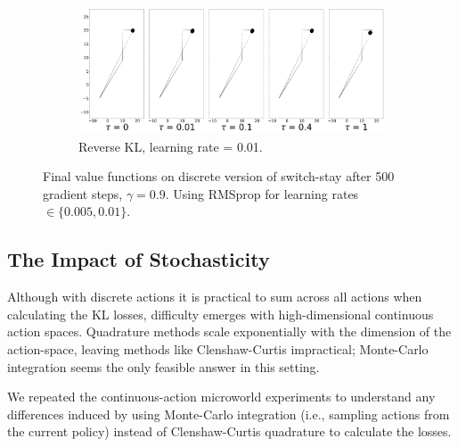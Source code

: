 \documentclass[twoside,11pt]{article}
\begin{document}
\begin{figure}[!htb]
  \begin{subfigure}[b]{0.85\linewidth}
        \centering
        \includegraphics[width=0.8\columnwidth]{figs/switch-stay/notlearnQ/polytope_reverse_optim=rmsprop_lr=[0.01].png}
        \caption{Reverse KL, learning rate = 0.01.}
        \label{fig:discrete-switch-stay-reverse-adam0.01}
  \end{subfigure}
  \caption{Final value functions on discrete version of switch-stay after 500 gradient steps, $\gamma = 0.9$. Using RMSprop for learning rates $\in \{0.005, 0.01\}$.}
  \label{fig:discrete-ss-all}
\end{figure}


\subsection{The Impact of Stochasticity}\label{sec:stochastic-microworld}
Although with discrete actions it is practical to sum across all actions when calculating the KL losses, difficulty emerges with high-dimensional continuous action spaces. Quadrature methods scale exponentially with the dimension of the action-space, leaving methods like Clenshaw-Curtis impractical; Monte-Carlo integration seems the only feasible answer in this setting. 

We repeated the continuous-action microworld experiments to understand any differences induced by using Monte-Carlo integration (i.e., sampling actions from the current policy) instead of Clenshaw-Curtis quadrature to calculate the losses. 
\end{document}
